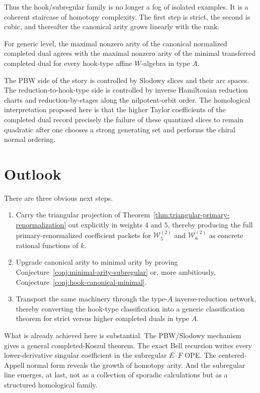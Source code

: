Thus the hook/subregular family is no longer a fog of isolated examples.  It is
a coherent staircase of homotopy complexity.  The first step is strict, the
second is cubic, and thereafter the canonical arity grows linearly with the
rank.

\begin{conjecture}
\label{conj:hook-canonical-minimal}
For generic level, the maximal nonzero arity of the canonical normalized
completed dual agrees with the maximal nonzero arity of the minimal transferred
completed dual for every hook-type affine $W$-algebra in type $A$.
\end{conjecture}

\begin{remark}
The PBW side of the story is controlled by Slodowy slices and their arc spaces.
The reduction-to-hook-type side is controlled by inverse Hamiltonian reduction
charts and reduction-by-stages along the nilpotent-orbit order.  The homological
interpretation proposed here is that the higher Taylor coefficients of the
completed dual record precisely the failure of these quantized slices to remain
quadratic after one chooses a strong generating set and performs the chiral
normal ordering.
\end{remark}

\section{Outlook}

There are three obvious next steps.

\begin{enumerate}[label=(\roman*)]
\item Carry the triangular projection of
Theorem~\ref{thm:triangular-primary-renormalization} out explicitly in weights
$4$ and $5$, thereby producing the full primary-renormalized coefficient packets
for $\mathcal W_5^{(2)}$ and $\mathcal W_6^{(2)}$ as concrete rational
functions of $k$.
\item Upgrade canonical arity to minimal arity by proving
Conjecture~\ref{conj:minimal-arity-subregular} or, more ambitiously,
Conjecture~\ref{conj:hook-canonical-minimal}.
\item Transport the same machinery through the type-$A$ inverse-reduction
network, thereby converting the hook-type classification into a generic
classification theorem for strict versus higher completed duals in type $A$.
\end{enumerate}

What is already achieved here is substantial.  The PBW/Slodowy mechanism gives a
general completed-Koszul theorem.  The exact Bell recursion writes every
lower-derivative singular coefficient in the subregular $E$--$F$ OPE.  The
centered-Appell normal form reveals the growth of homotopy arity.  And the
subregular line emerges, at last, not as a collection of sporadic calculations
but as a structured homological family.
